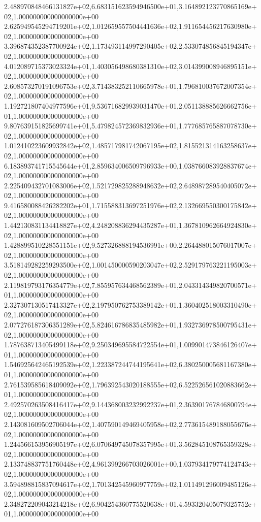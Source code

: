 2.488970848466131827e+02,6.683151623594946500e+01,3.164892123770865169e+02,1.000000000000000000e+00
2.625949545294719201e+02,1.012659557504441636e+02,1.911654456217630980e+02,1.000000000000000000e+00
3.396874352387700924e+02,1.173493114997290405e+02,2.533074856845194347e+02,1.000000000000000000e+00
4.012089715373023324e+01,1.403056498680381310e+02,3.014399008946895151e+02,1.000000000000000000e+00
2.608573270191096753e+02,3.714383252110665978e+01,1.796810037672007354e+02,1.000000000000000000e+00
1.192721807404977596e+01,9.536716829939031470e+01,2.051138885626662756e+01,1.000000000000000000e+00
9.807639151825699741e+01,5.479824572369832936e+01,1.777685765887078730e+02,1.000000000000000000e+00
1.012410223609932842e+02,1.485717981742067195e+02,1.815521314163258637e+02,1.000000000000000000e+00
6.183893741715545644e+01,2.859634006509796933e+00,1.038766083928837674e+02,1.000000000000000000e+00
2.225409432701083006e+02,1.521729825288948632e+02,2.648987289540405072e+02,1.000000000000000000e+00
9.416580088426282202e+01,1.715588313697251976e+02,2.132669550300175842e+02,1.000000000000000000e+00
1.442130831134418827e+02,4.248208836294435287e+01,1.367810962664924830e+02,1.000000000000000000e+00
1.428899510228551151e+02,9.527326888194536991e+00,2.264488015076017007e+02,1.000000000000000000e+00
3.518149282259293500e+02,1.001450000590203047e+02,2.529179763221195003e+02,1.000000000000000000e+00
2.119819793176354779e+02,7.855957634468562389e+01,2.043314349820700571e+01,1.000000000000000000e+00
2.327307130517413327e+02,2.197950762753389142e+01,1.360402518003310490e+02,1.000000000000000000e+00
2.077276187306351289e+02,5.824616786835485982e+01,1.932736978500795431e+02,1.000000000000000000e+00
1.787638713405499118e+02,9.250349695584722554e+01,1.009901473846126407e+01,1.000000000000000000e+00
1.546925642465192539e+02,1.223387244744195641e+02,6.380250005681167380e+01,1.000000000000000000e+00
2.761539585618409092e+02,1.796392543020188555e+02,6.522526561020883662e+01,1.000000000000000000e+00
2.492570263508416417e+02,9.144368003232992237e+01,2.363901767846800794e+02,1.000000000000000000e+00
2.143081609502706044e+02,1.407590149469405958e+02,2.773615489188055676e+02,1.000000000000000000e+00
1.244566153956905197e+02,6.070649745078357995e+01,3.562845108765359328e+02,1.000000000000000000e+00
2.133748837751760448e+02,4.961399266703026001e+00,1.037934179774124743e+02,1.000000000000000000e+00
3.594898815837094617e+02,1.701342545960977759e+02,1.011491296009485126e+02,1.000000000000000000e+00
2.348272209043214218e+02,6.904254360775520638e+01,4.593320405079325752e+01,1.000000000000000000e+00
